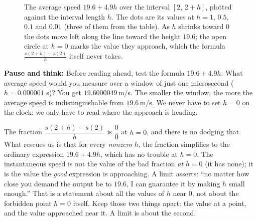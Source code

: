 \begin{figure}[htbp]
\centering
{}
\caption{The average speed $19.6+4.9h$ over the interval $[2,\,2+h]$, plotted against the interval length $h$. The dots are its values at $h=1$, $0.5$, $0.1$ and $0.01$ (three of them from the table). As $h$ shrinks toward $0$ the dots move left along the line toward the height $19.6$; the open circle at $h=0$ marks the value they approach, which the formula $\frac{s(2+h)-s(2)}{h}$ itself never takes.}
\label{ch01:fig-avg-speeds}
\end{figure}

\begin{recoverybox}
\textbf{Pause and think:} Before reading ahead, test the formula $19.6 + 4.9h$.
What average speed would you measure over a window of just one microsecond
($h = 0.000001$ s)? You get $19.6000049$\,m/s. The smaller the window, the more
the average speed is indistinguishable from $19.6$\,m/s. We never have to set
$h = 0$ on the clock; we only have to read where the approach is heading.
\end{recoverybox}

\begin{happeningbox}
The fraction $\dfrac{s(2+h)-s(2)}{h}$ is $\dfrac{0}{0}$ at $h = 0$, and
there is no dodging that. What rescues us is that for every \emph{nonzero} $h$,
the fraction simplifies to the ordinary expression $19.6 + 4.9h$,
which has no trouble at $h = 0$. The instantaneous speed is not the value
of the bad fraction \emph{at} $h=0$ (it has none); it is the value the
\emph{good} expression is approaching. A limit asserts: ``no matter
how close you demand the output be to $19.6$, I can guarantee it by making $h$
small enough.'' That is a statement about all the values of $h$ near $0$, not
about the forbidden point $h=0$ itself. Keep those two things apart: the value at
a point, and the value approached near it. A limit is about the second.
\end{happeningbox}

